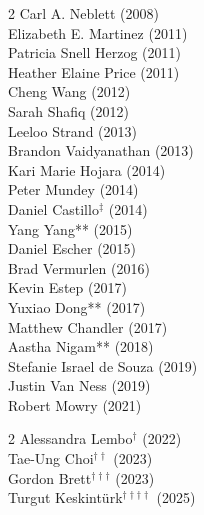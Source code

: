 \begin{multicols}{2}
\noindent
    Carl A. Neblett (2008) \\
    Elizabeth E. Martinez (2011) \\
    Patricia Snell Herzog (2011) \\
    Heather Elaine Price (2011) \\
    Cheng Wang (2012) \\
    Sarah Shafiq (2012) \\
    Leeloo Strand (2013) \\
    Brandon Vaidyanathan (2013) \\
    Kari Marie Hojara (2014) \\
    Peter Mundey (2014) \\
    Daniel Castillo\textcolor{uclablue}{$^{\ddag}$} (2014)  \\
    Yang Yang\textcolor{uclablue}{**} (2015) \\
    Daniel Escher (2015) \\
    Brad Vermurlen (2016) \\
    Kevin Estep (2017) \\
    Yuxiao Dong\textcolor{uclablue}{**}  (2017) \\
    Matthew Chandler (2017) \\
    Aastha Nigam\textcolor{uclablue}{**}  (2018) \\
    Stefanie Israel de Souza (2019) \\
    Justin Van Ness (2019) \\
    Robert Mowry (2021)
\end{multicols}
\medskip

\begin{multicols}{2} \noindent
    Alessandra Lembo\textcolor{uclablue}{$^{\dag}$} (2022) \\
    Tae-Ung Choi\textcolor{uclablue}{$^{\dag \dag}$} (2023) \\
    Gordon Brett\textcolor{uclablue}{$^{\dag \dag \dag}$} (2023) \\
    Turgut Keskint\"{u}rk\textcolor{uclablue}{$^{\dag \dag \dag \dag}$} (2025)

\end{multicols}
\medskip
